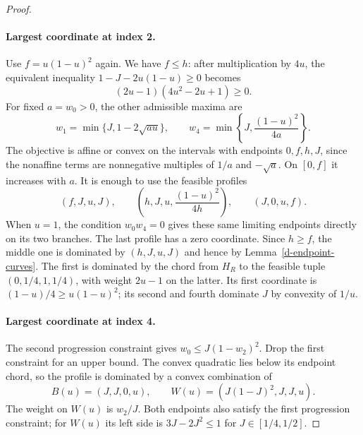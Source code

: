 \begin{proof}
\paragraph{Largest coordinate at index 2.}
Use $f=u(1-u)^2$ again. We have $f\leq h$: after multiplication by
$4u$, the equivalent inequality $1-J-2u(1-u)\geq0$ becomes
\[
(2u-1)(4u^2-2u+1)\geq0.
\]
For fixed $a=w_0>0$, the other admissible maxima are
\begin{equation}\label{d-largest-two-bounds}
w_1=\min\{J,1-2\sqrt{au}\},\qquad
w_4=\min\left\{J,\frac{(1-u)^2}{4a}\right\}.
\end{equation}
The objective is affine or convex on the intervals with endpoints
$0,f,h,J$, since the nonaffine terms are nonnegative multiples of
$1/a$ and $-\sqrt a$. On $[0,f]$ it increases with $a$. It is enough
to use the feasible profiles
\begin{equation}\label{d-largest-two-profiles}
(f,J,u,J),\qquad
\left(h,J,u,\frac{(1-u)^2}{4h}\right),\qquad
(J,0,u,f).
\end{equation}
When $u=1$, the condition $w_0w_4=0$ gives these same limiting endpoints
directly on its two branches. The last profile has a zero coordinate.
Since $h\geq f$, the middle one is dominated by $(h,J,u,J)$ and hence
by Lemma~\ref{d-endpoint-curves}. The first is dominated by the chord
from $H_R$ to the feasible tuple $(0,1/4,1,1/4)$, with weight $2u-1$
on the latter. Its first coordinate is $(1-u)/4\geq u(1-u)^2$;
its second and fourth dominate $J$ by convexity of $1/u$.

\paragraph{Largest coordinate at index 4.}
The second progression constraint gives
$w_0\leq J(1-w_2)^2$. Drop the first constraint for an upper bound.
The convex quadratic lies below its endpoint chord, so the profile is
dominated by a convex combination of
\begin{equation}\label{d-largest-four-curves}
B(u)=(J,J,0,u),\qquad W(u)=(J(1-J)^2,J,J,u).
\end{equation}
The weight on $W(u)$ is $w_2/J$. Both endpoints also satisfy the first
progression constraint; for $W(u)$ its left side is $3J-2J^2\leq1$
for $J\in[1/4,1/2]$.


\end{proof}
